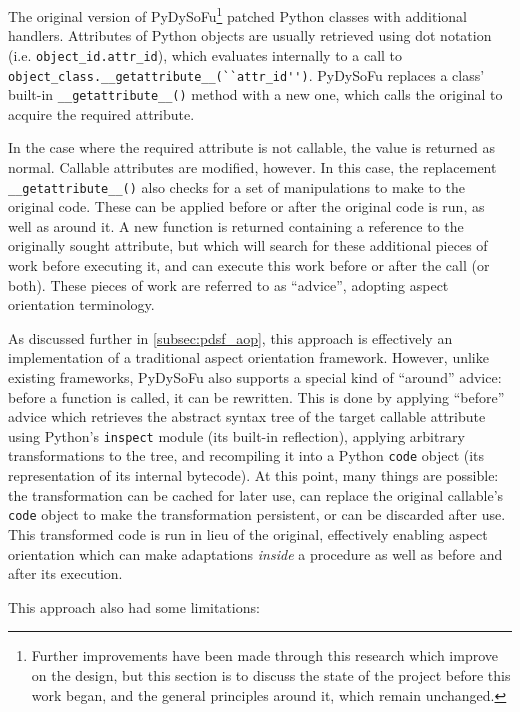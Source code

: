 The original version of PyDySoFu\footnote{Further improvements have been made
through this research which improve on the design, but this section is to
discuss the state of the project before this work began, and the general
principles around it, which remain unchanged.} patched Python classes with
additional handlers. Attributes of Python objects are usually retrieved using
dot notation (i.e. \lstinline{object_id.attr_id}), which evaluates internally to
a call to \lstinline{object_class.__getattribute__(``attr_id'')}. PyDySoFu replaces a
class' built-in \lstinline{__getattribute__()} method with a new one, which
calls the original to acquire the required attribute. 

In the case where the required attribute is not callable, the value is returned
as normal. Callable attributes are modified, however. In this case, the
replacement \lstinline{__getattribute__()} also checks for a set of
manipulations to make to the original code. These can be applied before or after
the original code is run, as well as around it. A new function is returned
containing a reference to the originally sought attribute, but which will search
for these additional pieces of work before executing it, and can execute this
work before or after the call (or both). These pieces of work are referred to as
``advice'', adopting aspect orientation terminology.

As discussed further in \cref{subsec:pdsf_aop}, this approach is effectively an
implementation of a traditional aspect orientation framework. However, unlike
existing frameworks, PyDySoFu also supports a special kind of ``around'' advice:
before a function is called, it can be rewritten. This is done by applying
``before'' advice which retrieves the abstract syntax tree of the target
callable attribute using Python's \lstinline{inspect} module (its built-in
reflection), applying arbitrary transformations to the tree, and recompiling it
into a Python \lstinline{code} object (its representation of its
internal bytecode). At this point, many things are possible: the transformation
can be cached for later use, can replace the original callable's
\lstinline{code} object to make the transformation persistent, or can be
discarded after use. This transformed code is run in lieu of the original,
effectively enabling aspect orientation which can make adaptations \emph{inside}
a procedure as well as before and after its execution.

This approach also had some limitations:

